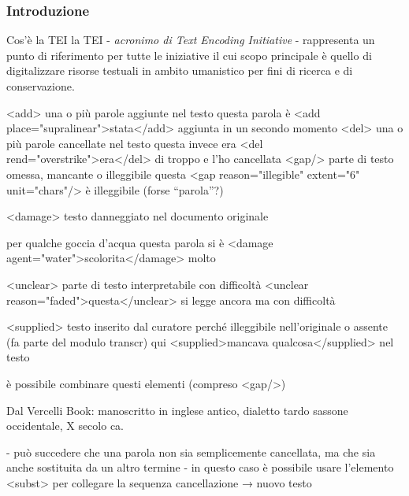 \begin{frame}
    \frametitle{Introduzione}
    \addtocounter{nframe}{1}
    

    \begin{block}{Cos'è la TEI}
        la TEI - \textit{acronimo di Text Encoding Initiative} - rappresenta un punto di riferimento per tutte le iniziative il cui scopo principale è quello di digitalizzare risorse testuali in ambito umanistico per fini di ricerca e di conservazione.
    \end{block}
    
\end{frame}

<add> una o più parole aggiunte nel testo
questa parola è <add place="supralinear">stata</add> aggiunta in un secondo momento
<del> una o più parole cancellate nel testo
questa invece era <del rend="overstrike">era</del>
 di troppo e l’ho cancellata
<gap/> parte di testo omessa, mancante o illeggibile
questa <gap reason="illegible" extent="6" unit="chars"/> è illeggibile (forse “parola”?)

<damage> testo danneggiato nel documento originale
   
per qualche goccia d’acqua questa parola si è
   <damage agent="water">scolorita</damage> molto

   <unclear> parte di testo interpretabile con difficoltà
<unclear reason="faded">questa</unclear> si legge
   ancora ma con difficoltà

   <supplied> testo inserito dal curatore perché illeggibile nell’originale o assente (fa parte del modulo transcr)
qui <supplied>mancava qualcosa</supplied> nel testo

è possibile combinare questi elementi (compreso <gap/>)

Dal Vercelli Book: manoscritto in inglese antico, dialetto tardo sassone occidentale, X secolo ca.

- può succedere che una parola non sia semplicemente cancellata, ma che sia anche sostituita da un altro termine
- in questo caso è possibile usare l’elemento <subst> per collegare la sequenza cancellazione → nuovo testo


